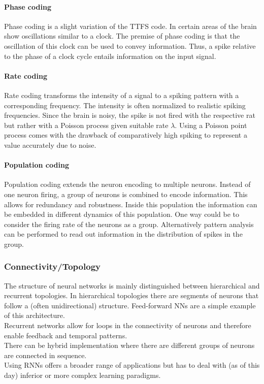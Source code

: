 	\paragraph{Phase coding}
	Phase coding is a slight variation of the \ac{TTFS} code. In certain areas of the brain show oscillations similar to a clock\cite{jacobs_critical_2013}. The premise of phase coding is that the oscillation of this clock can be used to convey information. Thus, a spike relative to the phase of a clock cycle entails information on the input signal.\\
	\paragraph{Rate coding}
	Rate coding transforms the intensity of a signal to a spiking pattern with a corresponding frequency. The intensity is often normalized to realistic spiking frequencies. Since the brain is noisy, the spike is not fired with the respective rat but rather with a Poisson process given suitable rate $\lambda$.
	Using a Poisson point process comes with the drawback of comparatively high spiking to represent a value accurately due to noise\cite{deneve_efficient_2016}.
	\paragraph{Population coding}
	Population coding extends the neuron encoding to multiple neurons. Instead of one neuron firing, a group of neurons is combined to encode information. This allows for redundancy and robustness. Inside this population the information can be embedded in different dynamics of this population. One way could be to consider the firing rate of the neurons as a group. Alternatively pattern analysis can be performed to read out information in the distribution of spikes in the group.\\

\subsubsection{Connectivity/Topology}
	The structure of neural networks is mainly distinguished between hierarchical and recurrent topologies. In hierarchical topologies there are segments of neurons that follow a (often unidirectional) structure. Feed-forward \acp{NN} are a simple example of this architecture.\\
	Recurrent networks allow for loops in the connectivity of neurons and therefore enable feedback and temporal patterns.\\
	There can be hybrid implementation where there are different groups of neurons are connected in sequence.\\
	Using \acp{RNN} offers a broader range of applications but has to deal with (as of this day) inferior or more complex learning paradigms.\\


